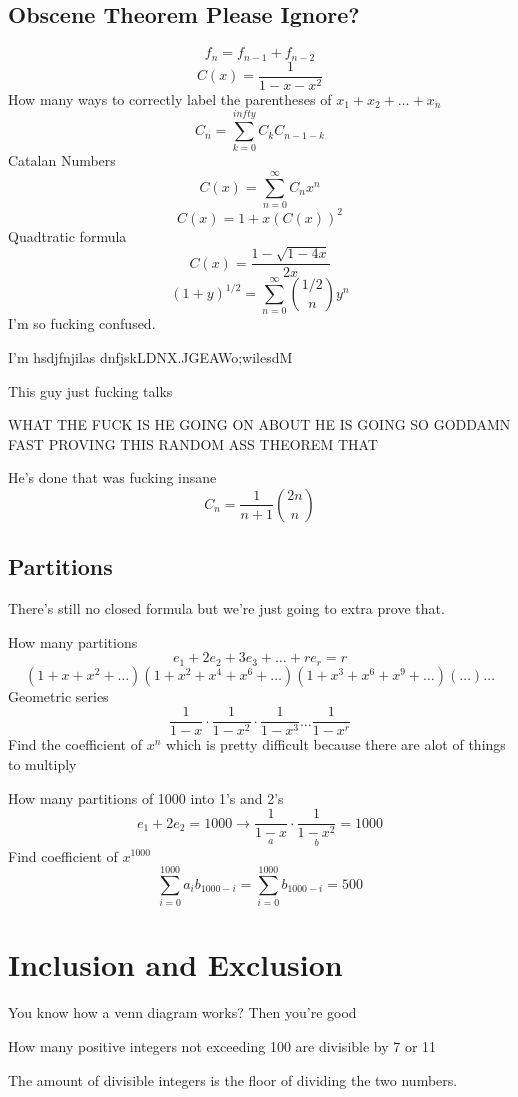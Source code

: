 \documentclass{report}
\begin{document}
\section{Obscene Theorem Please Ignore?}
\[
f_n = f_{n-1} + f_{n-2}
\]
\[
C(x) = \frac{1}{1 - x - x^2}
\]
How many ways to correctly label the parentheses of $x_1 + x_2 + \ldots + x_n$
\[
C_n = \sum^{infty}_{k = 0}C_kC_{n-1-k}
\]
Catalan Numbers
\[
C(x) = \sum^{\infty}_{n = 0}C_nx^n
\]
\[
C(x) = 1 + x(C(x))^2
\]
Quadtratic formula
\[
C(x) = \frac{1 - \sqrt{1 - 4x}}{2x}
\]
\[
(1 + y)^{1/2} = \sum^{\infty}_{n = 0}{1/2 \choose n}y^n
\]
I'm so fucking confused.

I'm hsdjfnjilas dnfjskLDNX.JGEAWo;wilesdM

This guy just fucking talks

WHAT THE FUCK IS HE GOING ON ABOUT HE IS GOING SO GODDAMN FAST PROVING THIS RANDOM ASS THEOREM THAT 

He's done that was fucking insane
\[
C_n = \frac{1}{n+1} {2n \choose n}
\]

\section{Partitions}
There's still no closed formula but we're just going to extra prove that.

How many partitions
\[
e_1 + 2e_2 + 3e_3 + \ldots + re_r = r
\]
\[
(1+x+x^2+\ldots)
(1 + x^2 + x^4 + x^6 + \ldots)
(1 + x^3 + x^6 + x^9 + \ldots)
(\ldots) \ldots
\]
Geometric series
\[
\frac{1}{1-x}
\cdot
\frac{1}{1 - x^2}
\cdot
\frac{1}{1 - x^3}
\ldots
\frac{1}{1 - x^r}
\]
Find the coefficient of $x^n$ which is pretty difficult because there are alot of things to multiply

How many partitions of 1000 into 1's and 2's
\[
e_1 + 2e_2 = 1000
\longrightarrow
\underset{a}{
\frac{1}{1-x}
}
\cdot
\underset{b}{
\frac{1}{1 - x^2}}
 = 1000
\]
Find coefficient of $x^1000$
\[
\sum^{1000}_{i=0}a_ib_{1000-i} = \sum^{1000}_{i = 0}b_{1000 - i}
=
500
\]



\chapter{Inclusion and Exclusion}
You know how a venn diagram works? Then you're good

How many positive integers not exceeding 100 are divisible by 7 or 11

The amount of divisible integers is the floor of dividing the two numbers.
\end{document}
